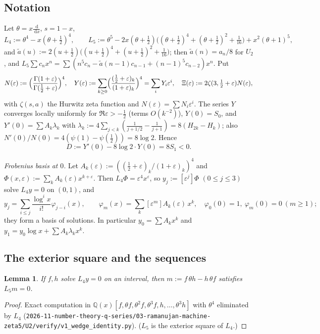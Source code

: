 \documentclass[11pt]{amsart}
\newtheorem{lemma}[theorem]{Lemma}
\theoremstyle{definition}
\theoremstyle{remark}
\numberwithin{equation}{section}
\newcommand{\Q}{\mathbb{Q}}
\newcommand{\dd}{\,\mathrm{d}}
\newcommand{\at}{\tilde a}
\newcommand{\file}[1]{\nolinkurl{2026-11-number-theory-q-series/03-ramanujan-machine-zeta5/#1}}
\begin{document}
\subsection{Notation}
Let $\theta=x\frac{\dd}{\dd x}$, $s=1-x$,
\[
L_4:=\theta^4-x(\theta+\tfrac12)^4,\qquad L_5:=\theta^5-2x(\theta+\tfrac12)\bigl((\theta+\tfrac12)^4+(\theta+\tfrac12)^2+\tfrac1{16}\bigr)+x^2(\theta+1)^5,
\]
and $\at(u):=2(u+\frac12)\bigl((u+\frac12)^4+(u+\frac12)^2+\frac1{16}\bigr)$; then $\at(n)=a_n/8$ for $U_2$, and $L_5\sum c_nx^n=\sum(n^5c_n-\at(n-1)c_{n-1}+(n-1)^5c_{n-2})x^n$. Put
\[
N(\varepsilon):=\Bigl(\frac{\Gamma(1+\varepsilon)}{\Gamma(\frac12+\varepsilon)}\Bigr)^4,\quad Y(\varepsilon):=\sum_{k\ge0}\Bigl(\frac{(\frac12+\varepsilon)_k}{(1+\varepsilon)_k}\Bigr)^4=\sum_iY_i\varepsilon^i,\quad \Xi(\varepsilon):=2\zeta(3,\tfrac12+\varepsilon)N(\varepsilon),
\]
with $\zeta(s,a)$ the Hurwitz zeta function and $N(\varepsilon)=\sum N_i\varepsilon^i$. The series $Y$ converges locally uniformly for $\Re\varepsilon>-\frac12$ (terms $O(k^{-2})$), $Y(0)=S_0$, and $Y'(0)=\sum A_k\lambda_k$ with $\lambda_k:=4\sum_{j<k}(\frac1{j+1/2}-\frac1{j+1})=8(H_{2k}-H_k)$; also $N'(0)/N(0)=4(\psi(1)-\psi(\frac12))=8\log2$. Hence
\begin{equation}\label{eq:D}
D:=Y'(0)-8\log2\cdot Y(0)=8S_1<0.
\end{equation}

\emph{Frobenius basis at $0$.} Let $A_k(\varepsilon):=((\frac12+\varepsilon)_k/(1+\varepsilon)_k)^4$ and $\Phi(x,\varepsilon):=\sum_kA_k(\varepsilon)x^{k+\varepsilon}$. Then $L_4\Phi=\varepsilon^4x^\varepsilon$, so $y_j:=[\varepsilon^j]\Phi$ $(0\le j\le3)$ solve $L_4y=0$ on $(0,1)$, and
\begin{equation}\label{eq:frob}
y_j=\sum_{i\le j}\frac{\log^ix}{i!}\varphi_{j-i}(x),\qquad \varphi_m(x)=\sum_k[\varepsilon^m]A_k(\varepsilon)\,x^k,\quad\varphi_0(0)=1,\ \varphi_m(0)=0\ (m\ge1);
\end{equation}
they form a basis of solutions. In particular $y_0=\sum A_kx^k$ and $y_1=y_0\log x+\sum A_k\lambda_kx^k$.

\subsection{The exterior square and the sequences}
\begin{lemma}\label{lem:wedge}
If $f,h$ solve $L_4y=0$ on an interval, then $m:=f\,\theta h-h\,\theta f$ satisfies $L_5m=0$.
\end{lemma}
\begin{proof}
Exact computation in $\Q(x)[f,\theta f,\theta^2f,\theta^3f,h,\dots,\theta^3h]$ with $\theta^4$ eliminated by $L_4$ (\file{U2/verify/v1_wedge_identity.py}). ($L_5$ is the exterior square of $L_4$.)
\end{proof}
\end{document}
